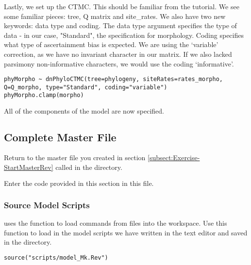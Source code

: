 Lastly, we set up the CTMC. 
This should be familiar from the  tutorial.
We see some familiar pieces: tree, Q matrix and site\_rates.
We also have two new keywords: data type and coding.
The data type argument specifies the type of data - in our case, "Standard", the specification for morphology.
Coding specifies what type of ascertainment bias is expected.
We are using the `variable' correction, as we have no invariant character in our matrix.
If we also lacked parsimony non-informative characters, we would use the coding `informative'. 

{\tt \begin{snugshade*}
\begin{lstlisting}
phyMorpho ~ dnPhyloCTMC(tree=phylogeny, siteRates=rates_morpho, Q=Q_morpho, type="Standard", coding="variable")
phyMorpho.clamp(morpho)
\end{lstlisting}
\end{snugshade*}}

All of the components of the model are now specified. \par

\subsection{Complete Master \Rev File}\label{subsect:Exercise-CompleteMCMC}

{\begin{framed}
Return to the master \Rev file you created in section \ref{subsect:Exercise-StartMasterRev} called {\textcolor{red}{}} in the  directory.

Enter the \Rev code provided in this section in this file.
\end{framed}}

\medskip
\subsubsection{Source Model Scripts}\label{subsub:Exercise-SourceMods}

\RevBayes uses the  function to load commands from \Rev files into the workspace.
Use this function to load in the model scripts we have written in the text editor and saved in the  directory.
{\tt \begin{snugshade*}
\begin{lstlisting}
source("scripts/model_Mk.Rev")

\end{lstlisting}
\end{snugshade*}}


